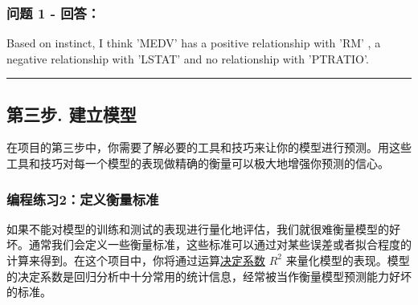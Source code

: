 \documentclass[11pt]{article}
\begin{document}
    \begin{center}
    \end{center}
    { \hspace*{\fill} \\}
    
    \begin{center}
    \end{center}
    { \hspace*{\fill} \\}
    
    \begin{center}
    \end{center}
    { \hspace*{\fill} \\}
    
    \subsubsection{问题 1 - 回答：}\label{ux95eeux9898-1---ux56deux7b54}

Based on instinct, I think 'MEDV' has a positive relationship with 'RM'
, a negative relationship with 'LSTAT' and no relationship with
'PTRATIO'.

    \begin{center}\rule{0.5\linewidth}{\linethickness}\end{center}

\subsection{第三步.
建立模型}\label{ux7b2cux4e09ux6b65.-ux5efaux7acbux6a21ux578b}

在项目的第三步中，你需要了解必要的工具和技巧来让你的模型进行预测。用这些工具和技巧对每一个模型的表现做精确的衡量可以极大地增强你预测的信心。

    \subsubsection{编程练习2：定义衡量标准}\label{ux7f16ux7a0bux7ec3ux4e602ux5b9aux4e49ux8861ux91cfux6807ux51c6}

如果不能对模型的训练和测试的表现进行量化地评估，我们就很难衡量模型的好坏。通常我们会定义一些衡量标准，这些标准可以通过对某些误差或者拟合程度的计算来得到。在这个项目中，你将通过运算\href{https://en.wikipedia.org/wiki/Coefficient_of_determination}{决定系数}
\(R^2\)
来量化模型的表现。模型的决定系数是回归分析中十分常用的统计信息，经常被当作衡量模型预测能力好坏的标准。
\end{document}
